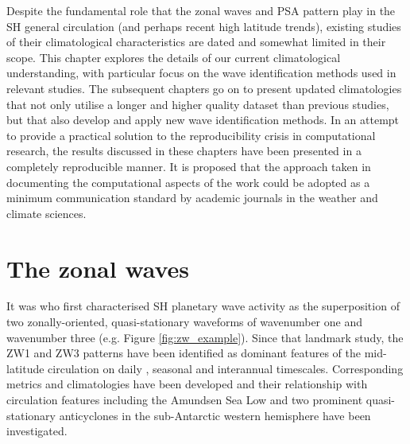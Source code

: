 Despite the fundamental role that the zonal waves and PSA pattern play in the SH general circulation (and perhaps recent high latitude trends), existing studies of their climatological characteristics are dated and somewhat limited in their scope. This chapter explores the details of our current climatological understanding, with particular focus on the wave identification methods used in relevant studies. The subsequent chapters go on to present updated climatologies that not only utilise a longer and higher quality dataset than previous studies, but that also develop and apply new wave identification methods. In an attempt to provide a practical solution to the reproducibility crisis in computational research, the results discussed in these chapters have been presented in a completely reproducible manner. It is proposed that the approach taken in documenting the computational aspects of the work could be adopted as a minimum communication standard by academic journals in the weather and climate sciences.


\section{The zonal waves}\label{s:zw_overview}

It was \citet{vanLoon1972} who first characterised SH planetary wave activity as the superposition of two zonally-oriented, quasi-stationary waveforms of wavenumber one and wavenumber three (e.g. Figure \ref{fig:zw_example}). Since that landmark study, the ZW1 and ZW3 patterns have been identified as dominant features of the mid-latitude circulation on daily \citep[e.g.][]{Kidson1988}, seasonal \citep[e.g.][]{Mo1985} and interannual \citep[e.g.][]{Karoly1989} timescales. Corresponding metrics and climatologies have been developed \citep{Raphael2004,Hobbs2007} and their relationship with circulation features including the Amundsen Sea Low \citep[ASL;][]{Turner2013} and two prominent quasi-stationary anticyclones in the sub-Antarctic western hemisphere \citep{Hobbs2010} have been investigated.

